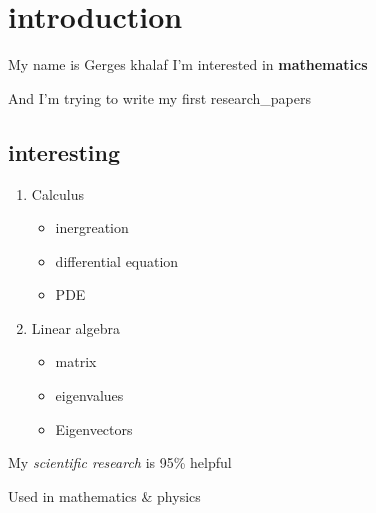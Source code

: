 \documentclass{article}
\begin{document}
\section{introduction}
My name is Gerges khalaf I'm interested in \textbf{mathematics}

And I'm trying to write my first research\_papers 
\subsection{interesting}
\begin{enumerate}
\item Calculus 
\begin{itemize}
\item inergreation
\item differential equation 
\item PDE 
\end{itemize}

\item Linear algebra 
\begin{itemize}
\item matrix 
\item eigenvalues 
\item Eigenvectors 
\end{itemize}
\end{enumerate}
My \textit{scientific research} is 95\% helpful 

Used in mathematics \& physics 
\end{document}
